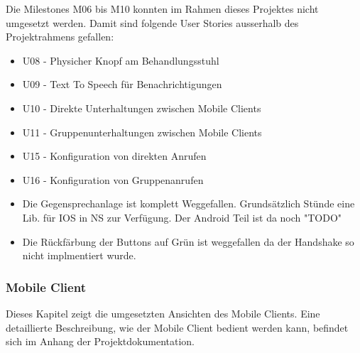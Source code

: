 Die Milestones M06 bis M10 konnten im Rahmen dieses Projektes nicht umgesetzt werden.
Damit sind folgende User Stories ausserhalb des Projektrahmens gefallen:

\begin{itemize}
    \item U08 - Physicher Knopf am Behandlungsstuhl
    \item U09 - Text To Speech für Benachrichtigungen
    \item U10 - Direkte Unterhaltungen zwischen Mobile Clients
    \item U11 - Gruppenunterhaltungen zwischen Mobile Clients
    \item U15 - Konfiguration von direkten Anrufen
    \item U16 - Konfiguration von Gruppenanrufen
\end{itemize}

\clearpage
\begin{itemize}
    \item Die Gegensprechanlage ist komplett Weggefallen.
    \subitem Grundsätzlich Stünde eine Lib. für IOS in NS zur Verfügung. Der Android Teil ist da noch "TODO"
    \item Die Rückfärbung der Buttons auf Grün ist weggefallen da der Handshake so nicht implmentiert wurde.
\end{itemize}

\clearpage
\subsubsection{Mobile Client}\label{subsec:mobile-client-realisation}

Dieses Kapitel zeigt die umgesetzten Ansichten des Mobile Clients.
Eine detaillierte Beschreibung, wie der Mobile Client bedient werden kann, befindet sich im Anhang der Projektdokumentation.

